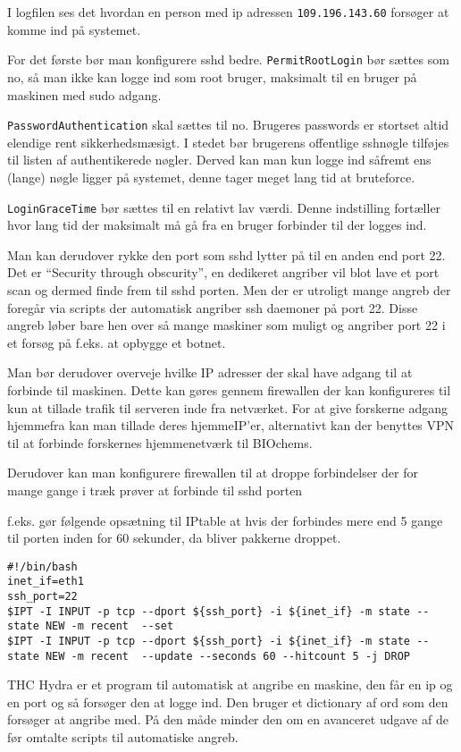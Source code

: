 \documentclass[10pt,a4paper,danish]{article}
\begin{document}
I logfilen ses det hvordan en person med ip adressen \texttt{109.196.143.60}
forsøger at komme ind på systemet.


For det første bør man konfigurere sshd bedre.
\texttt{PermitRootLogin} bør sættes som no, så man ikke kan logge ind som root
bruger, maksimalt til en bruger på maskinen med sudo adgang.

\texttt{PasswordAuthentication} skal sættes til no.
Brugeres passwords er stortset altid elendige rent sikkerhedsmæsigt. I stedet
bør brugerens offentlige sshnøgle tilføjes til listen af authentikerede nøgler.
Derved kan man kun logge ind såfremt ens (lange) nøgle ligger på systemet, denne
tager meget lang tid at bruteforce.

\texttt{LoginGraceTime} bør sættes til en relativt lav værdi. Denne indstilling
fortæller hvor lang tid der maksimalt må gå fra en bruger forbinder til der
logges ind.

Man kan derudover rykke den port som sshd lytter på til en anden end port 22.
Det er ``Security through obscurity'', en dedikeret angriber vil blot lave et
port scan og dermed finde frem til sshd porten. Men der er utroligt mange angreb
der foregår via scripts der automatisk angriber ssh daemoner på port 22.
Disse angreb løber bare hen over så mange maskiner som muligt og angriber port
22 i et forsøg på f.eks. at opbygge et botnet.

Man bør derudover overveje hvilke IP adresser der skal have adgang til at
forbinde til maskinen. Dette kan gøres gennem firewallen der kan konfigureres
til kun at tillade trafik til serveren inde fra netværket.
For at give forskerne adgang hjemmefra kan man tillade deres hjemmeIP'er,
alternativt kan der benyttes VPN til at forbinde forskernes hjemmenetværk til
BIOchems.

Derudover kan man konfigurere firewallen til at droppe forbindelser der for
mange gange i træk prøver at forbinde til sshd porten

f.eks. gør følgende opsætning\cite{portdrop} til IPtable at hvis der forbindes mere end 5 gange
til porten inden for 60 sekunder, da bliver pakkerne droppet.
\begin{verbatim}
#!/bin/bash
inet_if=eth1
ssh_port=22
$IPT -I INPUT -p tcp --dport ${ssh_port} -i ${inet_if} -m state --state NEW -m recent  --set
$IPT -I INPUT -p tcp --dport ${ssh_port} -i ${inet_if} -m state --state NEW -m recent  --update --seconds 60 --hitcount 5 -j DROP
\end{verbatim}


THC Hydra er et program til automatisk at angribe en maskine, den får en ip og en
port og så forsøger den at logge ind. Den bruger et dictionary af ord som den
forsøger at angribe med.
På den måde minder den om en avanceret udgave af de før omtalte scripts til
automatiske angreb.
\end{document}
